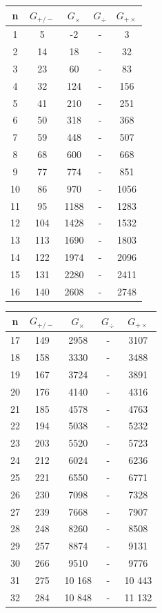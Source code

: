 \documentclass[a4paper]{article}
\begin{document}
	\begin{center}
		\begin{tabular}{| c | c | c | c | c |}
			\hline
			n & $G_{+/-}$ & $G_{\times}$ & $G_{\div}$ & $G_{+\times}$ \\\hline
			1 & 5 & -2 & - & 3 \\\hline
			2 & 14 & 18 & - & 32 \\\hline
			3 & 23 & 60 & - & 83 \\\hline
			4 & 32 & 124 & - & 156 \\\hline
			5 & 41 & 210 & - & 251 \\\hline
			6 & 50 & 318 & - & 368 \\\hline
			7 & 59 & 448 & - & 507 \\\hline
			8 & 68 & 600 & - & 668 \\\hline
			9 & 77 & 774 & - & 851 \\\hline
			10 & 86 & 970 & - & 1056 \\\hline
			11 & 95 & 1188 & - & 1283 \\\hline
			12 & 104 & 1428 & - & 1532 \\\hline
			13 & 113 & 1690 & - & 1803 \\\hline
			14 & 122 & 1974 & - & 2096 \\\hline
			15 & 131 & 2280 & - & 2411 \\\hline
			16 & 140 & 2608 & - & 2748 \\\hline
		\end{tabular}
		\begin{tabular}{| c | c | c | c | c |}
			\hline
			n & $G_{+/-}$ & $G_{\times}$ & $G_{\div}$ & $G_{+\times}$ \\\hline
			17 & 149 & 2958 & - & 3107 \\\hline
			18 & 158 & 3330 & - & 3488 \\\hline
			19 & 167 & 3724 & - & 3891 \\\hline
			20 & 176 & 4140 & - & 4316 \\\hline
			21 & 185 & 4578 & - & 4763 \\\hline
			22 & 194 & 5038 & - & 5232 \\\hline
			23 & 203 & 5520 & - & 5723 \\\hline
			24 & 212 & 6024 & - & 6236 \\\hline
			25 & 221 & 6550 & - & 6771 \\\hline
			26 & 230 & 7098 & - & 7328 \\\hline
			27 & 239 & 7668 & - & 7907 \\\hline
			28 & 248 & 8260 & - & 8508 \\\hline
			29 & 257 & 8874 & - & 9131 \\\hline
			30 & 266 & 9510 & - & 9776 \\\hline
			31 & 275 & 10 168 & - & 10 443 \\\hline
			32 & 284 & 10 848 & - & 11 132 \\\hline
		\end{tabular}
	\end{center}
	
\end{document}
